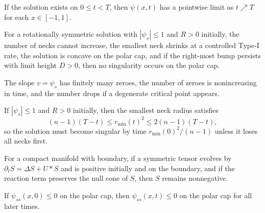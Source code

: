 \begin{corollary}
\label{ch02-cor-neckpinch-limit-profile}
If the solution exists on \(0\le t<T\), then \(\psi(x,t)\) has a pointwise
limit as \(t\nearrow T\) for each \(x\in[-1,1]\).
\end{corollary}

\begin{proposition}
\label{ch02-prop-neckpinch-profile}
For a rotationally symmetric solution with \(|\psi_s|\le 1\) and \(R>0\)
initially, the number of necks cannot increase, the smallest neck shrinks at a
controlled Type-I rate, the solution is concave on the polar cap, and if the
right-most bump persists with limit height \(D>0\), then no singularity occurs
on the polar cap.
\end{proposition}

\begin{lemma}
\label{ch02-lem-neckpinch-zeroes}
The slope \(v=\psi_s\) has finitely many zeroes, the number of zeroes is
nonincreasing in time, and the number drops if a degenerate critical point
appears.
\end{lemma}

\begin{lemma}
\label{ch02-lem-neckpinch-neck-rate}
If \(|\psi_s|\le 1\) and \(R>0\) initially, then the smallest neck radius
satisfies
\[
(n-1)(T-t)\le r_{\min}(t)^2\le 2(n-1)(T-t),
\]
so the solution must become singular by time \(r_{\min}(0)^2/(n-1)\) unless it
loses all necks first.
\end{lemma}

\begin{lemma}
\label{ch02-lem-tensor-maximum-boundary}
For a compact manifold with boundary, if a symmetric tensor evolves by
\(\partial_t S=\Delta S+U*S\) and is positive initially and on the boundary, and
if the reaction term preserves the null cone of \(S\), then \(S\) remains
nonnegative.
\end{lemma}

\begin{lemma}
\label{ch02-lem-neckpinch-concavity-polar-cap}
If \(\psi_{ss}(x,0)\le 0\) on the polar cap, then \(\psi_{ss}(x,t)\le 0\) on
the polar cap for all later times.
\end{lemma}

